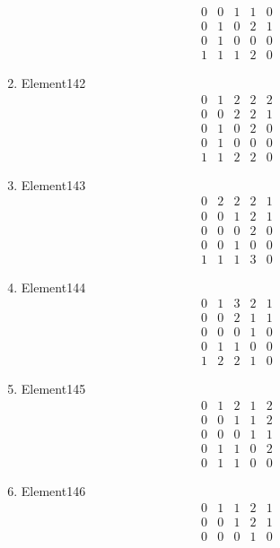 \documentclass[12pt]{article}
\begin{document}
\begin{multicols}{3}
\begin{enumerate}
\begin{equation*}
\begin{array}{ccccc}
0&0&1&1&0\\
0&1&0&2&1\\
0&1&0&0&0\\
1&1&1&2&0
\end{array}
\end{equation*}
\item Element142
\begin{equation*}
\begin{array}{ccccc}
0&1&2&2&2\\
0&0&2&2&1\\
0&1&0&2&0\\
0&1&0&0&0\\
1&1&2&2&0
\end{array}
\end{equation*}
\item Element143
\begin{equation*}
\begin{array}{ccccc}
0&2&2&2&1\\
0&0&1&2&1\\
0&0&0&2&0\\
0&0&1&0&0\\
1&1&1&3&0
\end{array}
\end{equation*}
\item Element144
\begin{equation*}
\begin{array}{ccccc}
0&1&3&2&1\\
0&0&2&1&1\\
0&0&0&1&0\\
0&1&1&0&0\\
1&2&2&1&0
\end{array}
\end{equation*}
\item Element145
\begin{equation*}
\begin{array}{ccccc}
0&1&2&1&2\\
0&0&1&1&2\\
0&0&0&1&1\\
0&1&1&0&2\\
0&1&1&0&0
\end{array}
\end{equation*}
\item Element146
\begin{equation*}
\begin{array}{ccccc}
0&1&1&2&1\\
0&0&1&2&1\\
0&0&0&1&0\\

\end{array}
\end{equation*}
\end{enumerate}
\end{multicols}
\end{document}
